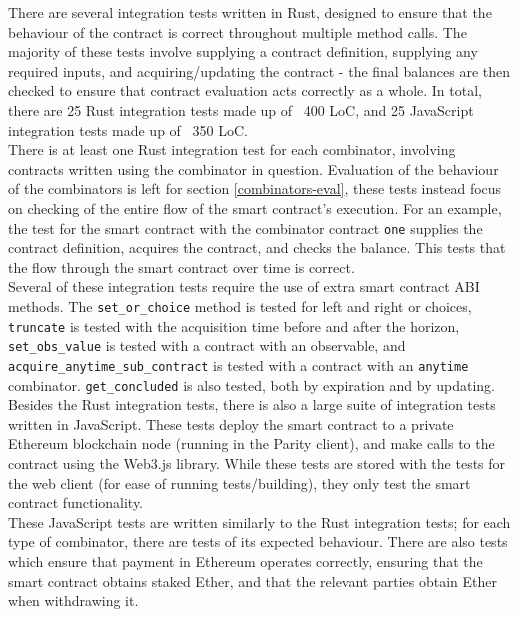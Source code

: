 There are several integration tests written in Rust, designed to ensure that the behaviour of the contract is correct throughout multiple method calls. The majority of these tests involve supplying a contract definition, supplying any required inputs, and acquiring/updating the contract - the final balances are then checked to ensure that contract evaluation acts correctly as a whole. In total, there are 25 Rust integration tests made up of ~400 LoC, and 25 JavaScript integration tests made up of ~350 LoC. \\

There is at least one Rust integration test for each combinator, involving contracts written using the combinator in question. Evaluation of the behaviour of the combinators is left for section \ref{combinators-eval}, these tests instead focus on checking of the entire flow of the smart contract's execution. For an example, the test for the smart contract with the combinator contract \texttt{one} supplies the contract definition, acquires the contract, and checks the balance. This tests that the flow through the smart contract over time is correct. \\

Several of these integration tests require the use of extra smart contract ABI methods. The \texttt{set\_or\_choice} method is tested for left and right or choices, \texttt{truncate} is tested with the acquisition time before and after the horizon, \texttt{set\_obs\_value} is tested with a contract with an observable, and \texttt{acquire\_anytime\_sub\_contract} is tested with a contract with an \texttt{anytime} combinator. \texttt{get\_concluded} is also tested, both by expiration and by updating. \\

Besides the Rust integration tests, there is also a large suite of integration tests written in JavaScript. These tests deploy the smart contract to a private Ethereum blockchain node (running in the Parity client), and make calls to the contract using the Web3.js library. While these tests are stored with the tests for the web client (for ease of running tests/building), they only test the smart contract functionality. \\

These JavaScript tests are written similarly to the Rust integration tests; for each type of combinator, there are tests of its expected behaviour. There are also tests which ensure that payment in Ethereum operates correctly, ensuring that the smart contract obtains staked Ether, and that the relevant parties obtain Ether when withdrawing it.

